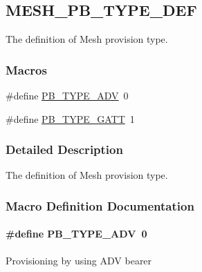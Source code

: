 \hypertarget{group___m_e_s_h___p_b___t_y_p_e___d_e_f}{}\subsection{M\+E\+S\+H\+\_\+\+P\+B\+\_\+\+T\+Y\+P\+E\+\_\+\+D\+EF}
\label{group___m_e_s_h___p_b___t_y_p_e___d_e_f}


The definition of Mesh provision type.  


\subsubsection*{Macros}
\begin{DoxyCompactItemize}
\item 
\#define \hyperlink{group___m_e_s_h___p_b___t_y_p_e___d_e_f_ga5e7fabe630cf2d5b1ffd83f718f2a856}{P\+B\+\_\+\+T\+Y\+P\+E\+\_\+\+A\+DV}~0
\item 
\#define \hyperlink{group___m_e_s_h___p_b___t_y_p_e___d_e_f_gade963cbef42498d8200551968d3e4d19}{P\+B\+\_\+\+T\+Y\+P\+E\+\_\+\+G\+A\+TT}~1
\end{DoxyCompactItemize}


\subsubsection{Detailed Description}
The definition of Mesh provision type. 



\subsubsection{Macro Definition Documentation}
\paragraph[{\texorpdfstring{P\+B\+\_\+\+T\+Y\+P\+E\+\_\+\+A\+DV}{PB_TYPE_ADV}}]{\setlength{\rightskip}{0pt plus 5cm}\#define P\+B\+\_\+\+T\+Y\+P\+E\+\_\+\+A\+DV~0}\hypertarget{group___m_e_s_h___p_b___t_y_p_e___d_e_f_ga5e7fabe630cf2d5b1ffd83f718f2a856}{}\label{group___m_e_s_h___p_b___t_y_p_e___d_e_f_ga5e7fabe630cf2d5b1ffd83f718f2a856}
Provisioning by using A\+DV bearer 
